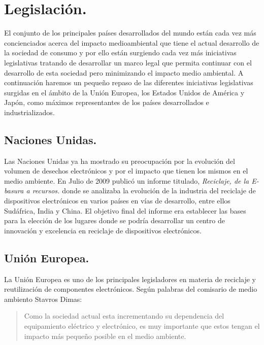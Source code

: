 \section{Legislación.}

El conjunto de los principales países desarrollados del mundo están cada vez más concienciados acerca del impacto medioambiental que tiene el actual desarrollo de la sociedad de consumo y por ello están surgiendo cada vez más iniciativas legislativas tratando de desarrollar un marco legal que permita continuar con el desarrollo de esta sociedad pero minimizando el impacto medio ambiental. A continuación haremos un pequeño repaso de las diferentes iniciativas legislativas surgidas en el ámbito de la Unión Europea, los Estados Unidos de América y Japón, como máximos representantes de los países desarrollados e industrializados.

\subsection{Naciones Unidas.}

Las Naciones Unidas ya ha mostrado su preocupación por la evolución del volumen de desechos electrónicos y por el impacto que tienen los mismos en el medio ambiente. En Julio de 2009 publicó un informe titulado, \emph{Reciclaje, de la E-basura a recursos. \cite{onu-e-waste}} donde se analizaba la evolución de la industria del reciclaje de dispositivos electrónicos en varios países en vías de desarrollo, entre ellos Sudáfrica, India y China. El objetivo final del informe era establecer las bases para la elección de los lugares donde se podría desarrollar un centro de innovación y excelencia en reciclaje de dispositivos electrónicos. 

\subsection{Unión Europea.}

La Unión Europea es uno de los principales legisladores en materia de reciclaje y reutilización de componentes electrónicos. Según palabras del comisario de medio ambiento Stavros Dimas:

\begin{quote}

\small Como la sociedad actual esta incrementando su dependencia del equipamiento eléctrico y electrónico, es muy importante que estos tengan el impacto más pequeño posible en el medio ambiente.

\end{quote}

